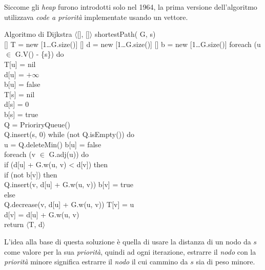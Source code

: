 \begin{note}
    Siccome gli \emph{heap} furono introdotti solo nel 1964, la prima versione
    dell'algoritmo utilizzava \emph{code a priorità} implementate usando un
    vettore.
\end{note}

\begin{minicode}{Algoritmo di Dijkstra}
\ind$\langle$[], []$\rangle$ shortestPath( G,  s)\\
    [] T = new [1\dots G.size()]\hfill{}
    [] d = new [1\dots G.size()]\hfill{}
    [] b = new [1\dots G.size()]\hfill{}
    \indf foreach (u $\in$ G.V() - \{s\}) do\\
        T[u] = nil\\
        d[u] = $+\infty$\\
        b[u] = false\\
    \indf T[s] = nil\\
    \indf d[s] = 0\\
    \indf b[s] = true\\
    \indf{} Q = PrioriryQueue()\\
    \indf Q.insert(s, 0)\hfill{}
    \indf while (not Q.isEmpty()) do\\
         u = Q.deleteMin()\hfill{}
        b[u] = false\\
        \indff foreach (v $\in$ G.adj(u)) do\\
            \indfff if (d[u] + G.w(u, v) < d[v]) then\\
                \indffff if (not b[v]) then\\
                    Q.insert(v, d[u] + G.w(u, v))\hfill{}
                    b[v] = true\\
                \indffff else\\
                    Q.decrease(v, d[u] + G.w(u, v))\hfill{}
            \indfff T[v] = u\\
            \indfff d[v] = d[u] + G.w(u, v)\\
    \indf return $\langle$T, d$\rangle$
\end{minicode}\noindent
L'idea alla base di questa soluzione è quella di usare la distanza di un nodo
da $s$ come valore per la sua \emph{priorità}, quindi ad ogni iterazione,
estrarre il \emph{nodo} con la \emph{priorità} minore significa estrarre il
\emph{nodo} il cui cammino da $s$ sia di peso minore.

